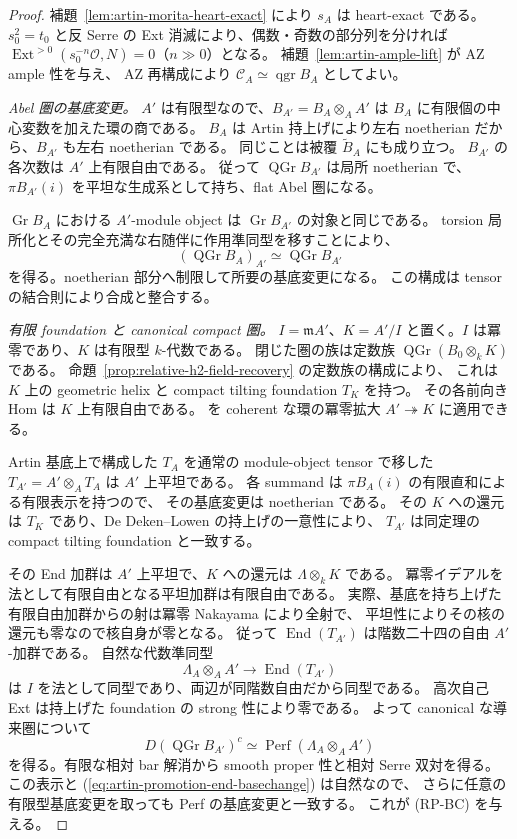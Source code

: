 \begin{proof}
補題~\ref{lem:artin-morita-heart-exact} により $s_A$ は heart-exact である。
$s_0^2=t_0$ と反 Serre の Ext 消滅により、偶数・奇数の部分列を分ければ
$\operatorname{Ext}^{>0}(s_0^{-n}\mathcal O,N)=0$（$n\gg0$）となる。
補題~\ref{lem:artin-ample-lift} が AZ ample 性を与え、
AZ 再構成により $\mathcal C_A\simeq\operatorname{qgr}B_A$ としてよい。

\emph{Abel 圏の基底変更。}
$A'$ は有限型なので、$B_{A'}=B_A\otimes_A A'$ は
$B_A$ に有限個の中心変数を加えた環の商である。
$B_A$ は Artin 持上げにより左右 noetherian だから、$B_{A'}$ も左右 noetherian である。
同じことは被覆 $\widetilde B_A$ にも成り立つ。
$B_{A'}$ の各次数は $A'$ 上有限自由である。
従って $\operatorname{QGr}B_{A'}$ は局所 noetherian で、
$\pi B_{A'}(i)$ を平坦な生成系として持ち、flat Abel 圏になる。

$\operatorname{Gr}B_A$ における $A'$-module object は
$\operatorname{Gr}B_{A'}$ の対象と同じである。
torsion 局所化とその完全充満な右随伴に作用準同型を移すことにより、
\[
 (\operatorname{QGr}B_A)_{A'}
 \simeq \operatorname{QGr}B_{A'}
\]
を得る。noetherian 部分へ制限して所要の基底変更になる。
この構成は tensor の結合則により合成と整合する。

\emph{有限 foundation と canonical compact 圏。}
$I=\mathfrak mA'$、$K=A'/I$ と置く。$I$ は冪零であり、$K$ は有限型 $k$-代数である。
閉じた圏の族は定数族 $\operatorname{QGr}(B_0\otimes_k K)$ である。
命題~\ref{prop:relative-h2-field-recovery} の定数族の構成により、
これは $K$ 上の geometric helix と compact tilting foundation $T_K$ を持つ。
その各前向き Hom は $K$ 上有限自由である。
\cite[Theorem 5.13]{DeDekenLowen2011} を coherent な環の冪零拡大
$A'\twoheadrightarrow K$ に適用できる。

Artin 基底上で構成した $T_A$ を通常の module-object tensor で移した
$T_{A'}=A'\otimes_A T_A$ は $A'$ 上平坦である。
各 summand は $\pi B_A(i)$ の有限直和による有限表示を持つので、
その基底変更は noetherian である。
その $K$ への還元は $T_K$ であり、De Deken--Lowen の持上げの一意性により、
$T_{A'}$ は同定理の compact tilting foundation と一致する。

その End 加群は $A'$ 上平坦で、$K$ への還元は
$\Lambda\otimes_k K$ である。
冪零イデアルを法として有限自由となる平坦加群は有限自由である。
実際、基底を持ち上げた有限自由加群からの射は冪零 Nakayama により全射で、
平坦性によりその核の還元も零なので核自身が零となる。
従って $\operatorname{End}(T_{A'})$ は階数二十四の自由 $A'$-加群である。
自然な代数準同型
\[
 \Lambda_A\otimes_A A'\longrightarrow\operatorname{End}(T_{A'})
 \tag{Artin-BC}\label{eq:artin-promotion-end-basechange}
\]
は $I$ を法として同型であり、両辺が同階数自由だから同型である。
高次自己 Ext は持上げた foundation の strong 性により零である。
よって canonical な導来圏について
\[
 D(\operatorname{QGr}B_{A'})^c
 \simeq\operatorname{Perf}(\Lambda_A\otimes_A A')
\]
を得る。有限な相対 bar 解消から smooth proper 性と相対 Serre 双対を得る。
この表示と (\ref{eq:artin-promotion-end-basechange}) は自然なので、
さらに任意の有限型基底変更を取っても Perf の基底変更と一致する。
これが (RP-BC) を与える。


\end{proof}
